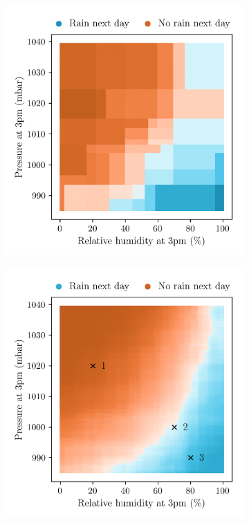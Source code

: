 \begin{figure}[t]
  \centering
  \begin{subfigure}{0.49\textwidth}
    \centering
    \includegraphics[scale=0.64]{graphics/weather_forest_2.png}%
  \end{subfigure}
  \begin{subfigure}{0.49\textwidth}
    \centering
    \includegraphics[scale=0.64]{graphics/weather_forest_design.png}%

\end{subfigure}
\end{figure}
